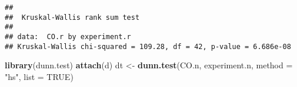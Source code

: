 \documentclass[12pt,]{article}
\newenvironment{Shaded}{\begin{snugshade}}{\end{snugshade}}
\newcommand{\KeywordTok}[1]{\textcolor[rgb]{0.13,0.29,0.53}{\textbf{#1}}}
\newcommand{\DataTypeTok}[1]{\textcolor[rgb]{0.13,0.29,0.53}{#1}}
\newcommand{\StringTok}[1]{\textcolor[rgb]{0.31,0.60,0.02}{#1}}
\newcommand{\OtherTok}[1]{\textcolor[rgb]{0.56,0.35,0.01}{#1}}
\newcommand{\OperatorTok}[1]{\textcolor[rgb]{0.81,0.36,0.00}{\textbf{#1}}}
\newcommand{\NormalTok}[1]{#1}
\begin{document}
\begin{Shaded}
\end{Shaded}

\begin{verbatim}
## 
##  Kruskal-Wallis rank sum test
## 
## data:  CO.r by experiment.r
## Kruskal-Wallis chi-squared = 109.28, df = 42, p-value = 6.686e-08
\end{verbatim}

\begin{Shaded}
\begin{Highlighting}[]
\KeywordTok{library}\NormalTok{(dunn.test)}
\KeywordTok{attach}\NormalTok{(d)}
\NormalTok{dt <-}\StringTok{ }\KeywordTok{dunn.test}\NormalTok{(CO.n, experiment.n, }\DataTypeTok{method =} \StringTok{"hs"}\NormalTok{, }\DataTypeTok{list =} \OtherTok{TRUE}\NormalTok{)}
\end{Highlighting}
\end{Shaded}
\end{document}
